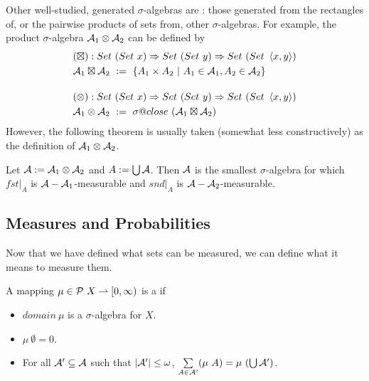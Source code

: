 \documentclass[preprint]{sigplanconf}
\newcommand{\restrict}[1]{\lvert_{#1}}
\newcommand{\pto}{\rightharpoonup}
\begin{document}
Other well-studied, generated $\sigma$-algebras are : those generated from the rectangles of, or the pairwise products of sets from, other $\sigma$-algebras.
For example, the product $\sigma$-algebra $\mathcal{A}_1 \otimes \mathcal{A}_2$ can be defined by
\begin{align}
	&\begin{aligned}
		&(\boxtimes) : Set~(Set~x) \tto Set~(Set~y) \tto Set~(Set~\pair{x,y}) \\
		&\A_1 \boxtimes \A_2 \ := \ \setb{A_1 \times A_2}{A_1 \in \A_1, A_2 \in \A_2} \\
	\end{aligned} \\
\nonumber \\[-6pt]
	&\begin{aligned}
		&(\otimes) : Set~(Set~x) \tto Set~(Set~y) \tto Set~(Set~\pair{x,y}) \\
		&\A_1 \otimes \A_2 \ := \ \sigma@close~(\A_1 \boxtimes \A_2) \\
	\end{aligned}
\end{align}
However, the following theorem is usually taken (somewhat less constructively) as the definition of $\mathcal{A}_1 \otimes \mathcal{A}_2$.
\begin{lemma}
Let $\mathcal{A} := \mathcal{A}_1 \otimes \mathcal{A}_2$ and $A := \textstyle\bigcup\mathcal{A}$.
Then $\mathcal{A}$ is the smallest $\sigma$-algebra for which $fst\restrict{A}$ is $\mathcal{A}-\mathcal{A}_1$-measurable and $snd\restrict{A}$ is $\mathcal{A}-\mathcal{A}_2$-measurable.
\end{lemma}

\subsection{Measures and Probabilities}

Now that we have defined what sets can be measured, we can define what it means to measure them.

\begin{definition}[Measure]
A mapping $\mu \in \powerset~X \pto [0,\infty)$ is a  if
\begin{itemize}
	\item $domain~\mu$ is a $\sigma$-algebra for $X$.
	\item $\mu~\emptyset = 0$.
	\item For all $\mathcal{A}' \subseteq \mathcal{A}$ such that $|\mathcal{A}'| \leq \omega$, $\sum\limits_{A \in \mathcal{A}'} (\mu~A) = \mu~(\textstyle\bigcup \mathcal{A}')$.
\end{itemize}
\end{definition}
\end{document}
